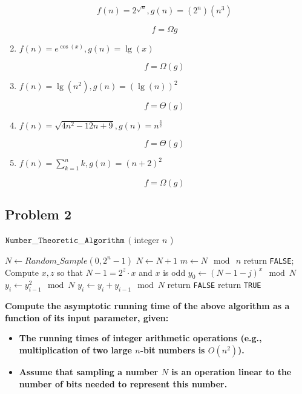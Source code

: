 \documentclass[11pt]{article}
\begin{document}
\begin{enumerate}
		\[ f(n) = 2^{\sqrt{n}}, g(n) = (2^n) (n^3) \]
		
		\[f = \Omega{g}\]
	
	\item $f(n) = e^{\cos(x)}, g(n) = \lg(x)$
	
		\[ f = \Omega(g) \]
	
	\item $ f(n) = \lg(n^2), g(n) = (\lg(n))^2 $
	
		\[ f = \Theta(g) \]
	
	\item $ f(n) = \sqrt{4n^2 - 12n + 9}, g(n) = n^{\frac{3}{2}} $
	
		\[ f = \Theta(g) \]
	
	\item $ f(n) = \sum_{k = 1}^{n} k, g(n) = (n + 2)^2 $
	
		\[ f = \Omega(g) \]

\end{enumerate}

\subsection*{Problem 2}

\begin{algorithm}[h]
\caption{${\tt Number\_Theoretic\_Algorithm}$ $($ integer $n$ ) }
\label{algo}
$N \leftarrow Random\_Sample( 0, 2^n-1)$\; 
{
  $N \leftarrow N + 1$  \; 
}
$m \leftarrow N \mod\ n$  \; 
{
  {
    return {\tt FALSE}; 
  }
  Compute $x,z$ so that $N - 1 = 2^z \cdot x$ and $x$ is odd\;
  $y_0 \leftarrow (N-1-j)^x \mod N$\;
  {
    $y_i \leftarrow y_{i-1}^2 \mod N$ \;
    $y_i \leftarrow y_i + y_{i-1} \mod N$\;
  }
  {
    return {\tt FALSE}  \;
  }
}
return {\tt TRUE}\;
\end{algorithm}

\textbf{Compute the asymptotic running time of the above algorithm as a function of its input parameter, given:}

\begin{itemize}
\item \textbf{The running times of integer arithmetic operations (e.g.,
  multiplication of two large $n$-bit numbers is $O(n^2)$).}
\item \textbf{Assume that sampling a number $N$ is an operation linear to the
  number of bits needed to represent this number.}
\end{itemize}
\end{document}
